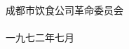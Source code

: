 \begin{center}
{%
	\Huge\bfseries%
}

\vspace{1\baselineskip}

{%
	\sffamily%
}

\vfill

成都市饮食公司革命委员会\\
\\
一九七二年七月
\end{center}

